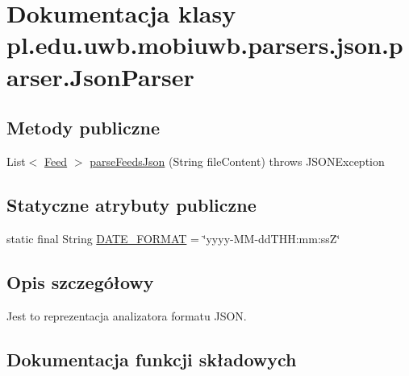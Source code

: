\hypertarget{classpl_1_1edu_1_1uwb_1_1mobiuwb_1_1parsers_1_1json_1_1parser_1_1_json_parser}{}\section{Dokumentacja klasy pl.\+edu.\+uwb.\+mobiuwb.\+parsers.\+json.\+parser.\+Json\+Parser}
\label{classpl_1_1edu_1_1uwb_1_1mobiuwb_1_1parsers_1_1json_1_1parser_1_1_json_parser}
\subsection*{Metody publiczne}
\begin{DoxyCompactItemize}
\item 
List$<$ \hyperlink{classpl_1_1edu_1_1uwb_1_1mobiuwb_1_1parsers_1_1json_1_1model_1_1_feed}{Feed} $>$ \hyperlink{classpl_1_1edu_1_1uwb_1_1mobiuwb_1_1parsers_1_1json_1_1parser_1_1_json_parser_a043b56cb439e04d6c214526bcddff3b4}{parse\+Feeds\+Json} (String file\+Content)  throws J\+S\+O\+N\+Exception     
\end{DoxyCompactItemize}
\subsection*{Statyczne atrybuty publiczne}
\begin{DoxyCompactItemize}
\item 
static final String \hyperlink{classpl_1_1edu_1_1uwb_1_1mobiuwb_1_1parsers_1_1json_1_1parser_1_1_json_parser_a80e2c60ee4706eb4fd301c9707a32e6f}{D\+A\+T\+E\+\_\+\+F\+O\+R\+M\+A\+T} = \char`\"{}yyyy-\/M\+M-\/dd\textquotesingle{}T\textquotesingle{}H\+H\+:mm\+:ss\textquotesingle{}Z\textquotesingle{}\char`\"{}
\end{DoxyCompactItemize}


\subsection{Opis szczegółowy}
Jest to reprezentacja analizatora formatu J\+S\+O\+N. 

\subsection{Dokumentacja funkcji składowych}
\hypertarget{classpl_1_1edu_1_1uwb_1_1mobiuwb_1_1parsers_1_1json_1_1parser_1_1_json_parser_a043b56cb439e04d6c214526bcddff3b4}{}
